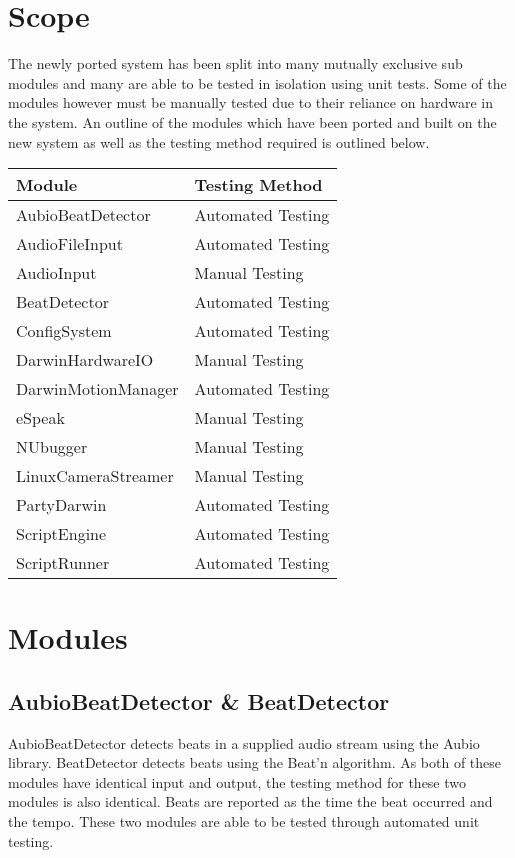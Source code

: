 \documentclass[english,12pt]{scrartcl}
\begin{document}
\section{Scope}
	The newly ported system has been split into many mutually exclusive sub modules and many are able to be tested in isolation using unit tests.
	Some of the modules however	must be manually tested due to their reliance on hardware in the system.
	An outline of the modules which have been ported and built on the new system as well as the testing method required is outlined below.
	\begin{tabular}{|p{7cm}|p{7cm}|}
		\hline \textbf{\large Module} & \textbf{\large Testing Method} \\ \hline
		AubioBeatDetector     & Automated Testing  \\ \hline
		AudioFileInput        & Automated Testing  \\ \hline
		AudioInput            & Manual Testing     \\ \hline
		BeatDetector          & Automated Testing  \\ \hline
		ConfigSystem          & Automated Testing  \\ \hline
		DarwinHardwareIO      & Manual Testing     \\ \hline
		DarwinMotionManager   & Automated Testing  \\ \hline
		eSpeak                & Manual Testing     \\ \hline
		NUbugger              & Manual Testing     \\ \hline
		LinuxCameraStreamer   & Manual Testing     \\ \hline
		PartyDarwin           & Automated Testing  \\ \hline
		ScriptEngine          & Automated Testing  \\ \hline
		ScriptRunner          & Automated Testing  \\ \hline
	\end{tabular}
	
\section{Modules}
	\subsection{AubioBeatDetector \& BeatDetector}
		AubioBeatDetector detects beats in a supplied audio stream using the Aubio library.
		BeatDetector detects beats using the Beat'n algorithm.
		As both of these modules have identical input and output, the testing method for these two modules is also identical.
		Beats are reported as the time the beat occurred and the tempo.
		These two modules are able to be tested through automated unit testing.
		
\end{document}
